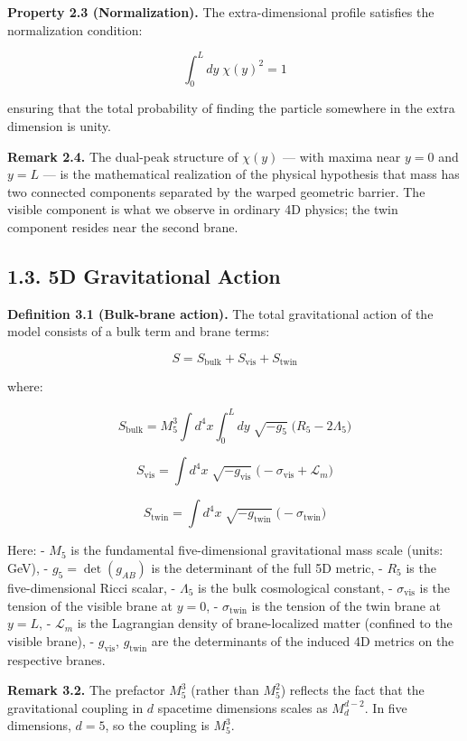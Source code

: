 \documentclass[
  11pt,
]{article}
\begin{document}
\textbf{Property 2.3 (Normalization).} The extra-dimensional profile
satisfies the normalization condition:

\[\int_0^L dy\;\chi(y)^2 = 1 \tag{7}\]

ensuring that the total probability of finding the particle somewhere in
the extra dimension is unity.

\textbf{Remark 2.4.} The dual-peak structure of \(\chi(y)\) --- with
maxima near \(y = 0\) and \(y = L\) --- is the mathematical realization
of the physical hypothesis that mass has two connected components
separated by the warped geometric barrier. The visible component is what
we observe in ordinary 4D physics; the twin component resides near the
second brane.

\bigskip

\hypertarget{d-gravitational-action}{%
\subsection{1.3. 5D Gravitational Action}\label{d-gravitational-action}}

\textbf{Definition 3.1 (Bulk-brane action).} The total gravitational
action of the model consists of a bulk term and brane terms:

\[S = S_{\text{bulk}} + S_{\text{vis}} + S_{\text{twin}} \tag{8}\]

where:

\[S_{\text{bulk}} = M_5^3 \int d^4x \int_0^L dy\;\sqrt{-g_5}\;\bigl(R_5 - 2\Lambda_5\bigr) \tag{9}\]

\[S_{\text{vis}} = \int d^4x\;\sqrt{-g_{\text{vis}}}\;\bigl(-\sigma_{\text{vis}} + \mathcal{L}_m\bigr) \tag{10}\]

\[S_{\text{twin}} = \int d^4x\;\sqrt{-g_{\text{twin}}}\;\bigl(-\sigma_{\text{twin}}\bigr) \tag{11}\]

Here: - \(M_5\) is the fundamental five-dimensional gravitational mass
scale (units: GeV), - \(g_5 = \det(g_{AB})\) is the determinant of the
full 5D metric, - \(R_5\) is the five-dimensional Ricci scalar, -
\(\Lambda_5\) is the bulk cosmological constant, -
\(\sigma_{\text{vis}}\) is the tension of the visible brane at
\(y = 0\), - \(\sigma_{\text{twin}}\) is the tension of the twin brane
at \(y = L\), - \(\mathcal{L}_m\) is the Lagrangian density of
brane-localized matter (confined to the visible brane), -
\(g_{\text{vis}}\), \(g_{\text{twin}}\) are the determinants of the
induced 4D metrics on the respective branes.

\textbf{Remark 3.2.} The prefactor \(M_5^3\) (rather than \(M_5^2\))
reflects the fact that the gravitational coupling in \(d\) spacetime
dimensions scales as \(M_d^{d-2}\). In five dimensions, \(d = 5\), so
the coupling is \(M_5^3\).
\end{document}
